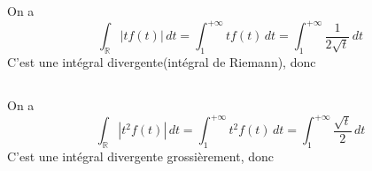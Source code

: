 \documentclass[a4paper,12pt]{book}
\begin{document}
\subsection{}
On a 
$$
\int_{\mathbb{R}}|tf(t)|\,dt=\int_1^{+\infty}tf(t)\,dt=\int_1^{+\infty}\frac{1}{2\sqrt{t}}\,dt
$$
C'est une intégral divergente(intégral de Riemann), donc 
\subsection{}
On a 
$$
\int_{\mathbb{R}}|t^2f(t)|\,dt=\int_1^{+\infty}t^2f(t)\,dt=\int_1^{+\infty}\frac{\sqrt{t}}{2}\,dt
$$
C'est une intégral divergente grossièrement, donc 
\end{document}
